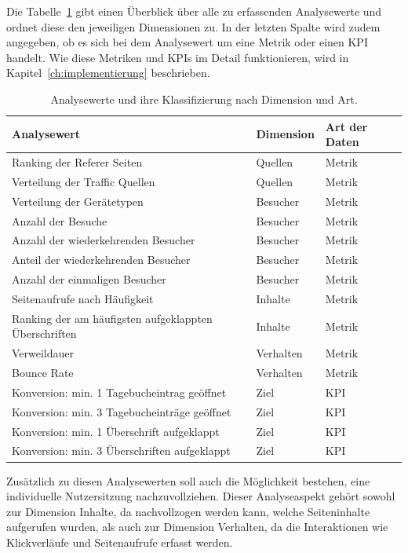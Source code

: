 Die Tabelle~\ref{tab:analysewerte} gibt einen Überblick über alle zu erfassenden Analysewerte und ordnet diese den jeweiligen Dimensionen zu. In der letzten Spalte wird zudem angegeben, ob es sich bei dem Analysewert um eine Metrik oder einen KPI handelt. Wie diese Metriken und KPIs im Detail funktionieren, wird in Kapitel~\ref{ch:implementierung} beschrieben.

\begin{table}[H]
    \centering
    \begin{tabularx}{\textwidth}{l l l}
        \hline
        \textbf{Analysewert} & \textbf{Dimension} & \textbf{Art der Daten} \\
        \hline
        Ranking der Referer Seiten & Quellen & Metrik \\
        Verteilung der Traffic Quellen & Quellen & Metrik \\
        Verteilung der Gerätetypen & Besucher & Metrik \\
        Anzahl der Besuche & Besucher & Metrik \\
        Anzahl der wiederkehrenden Besucher & Besucher & Metrik \\
        Anteil der wiederkehrenden Besucher & Besucher & Metrik \\
        Anzahl der einmaligen Besucher & Besucher & Metrik \\
        Seitenaufrufe nach Häufigkeit & Inhalte & Metrik \\
        Ranking der am häufigsten aufgeklappten Überschriften & Inhalte & Metrik \\
        Verweildauer & Verhalten & Metrik \\
        Bounce Rate & Verhalten & Metrik \\
        Konversion: min. 1 Tagebucheintrag geöffnet & Ziel & KPI \\
        Konversion: min. 3 Tagebucheinträge geöffnet & Ziel & KPI \\
        Konversion: min. 1 Überschrift aufgeklappt & Ziel & KPI \\
        Konversion: min. 3 Überschriften aufgeklappt & Ziel & KPI \\
        \hline
    \end{tabularx}
    \caption{Analysewerte und ihre Klassifizierung nach Dimension und Art.}
    \label{tab:analysewerte}
\end{table}

Zusätzlich zu diesen Analysewerten soll auch die Möglichkeit bestehen, eine individuelle Nutzersitzung nachzuvollziehen. Dieser Analyseaspekt gehört sowohl zur Dimension Inhalte, da nachvollzogen werden kann, welche Seiteninhalte aufgerufen wurden, als auch zur Dimension Verhalten, da die Interaktionen wie Klickverläufe und Seitenaufrufe erfasst werden.

